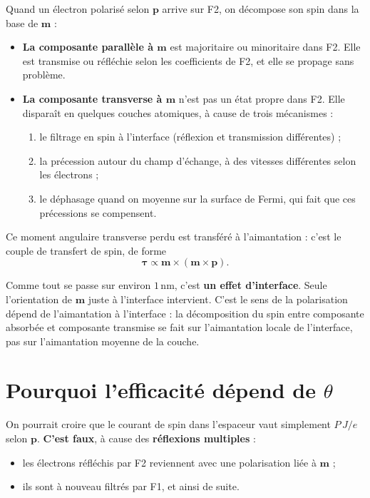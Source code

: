 \documentclass[11pt,a4paper]{article}
\newcommand{\vm}{\bm{m}}
\newcommand{\vp}{\bm{p}}
\begin{document}
Quand un électron polarisé selon $\vp$ arrive sur F2, on décompose son
spin dans la base de $\vm$ :
\begin{itemize}
  \item \textbf{La composante parallèle à $\vm$} est majoritaire ou
    minoritaire dans F2. Elle est transmise ou réfléchie selon les
    coefficients de F2, et elle se propage sans problème.
  \item \textbf{La composante transverse à $\vm$} n'est pas un état propre
    dans F2. Elle disparaît en quelques couches atomiques, à cause de trois
    mécanismes :
    \begin{enumerate}
      \item le filtrage en spin à l'interface (réflexion et transmission
        différentes) ;
      \item la précession autour du champ d'échange, à des vitesses
        différentes selon les électrons ;
      \item le déphasage quand on moyenne sur la surface de Fermi, qui fait
        que ces précessions se compensent.
    \end{enumerate}
\end{itemize}

Ce moment angulaire transverse perdu est transféré à l'aimantation :
c'est le couple de transfert de spin, de forme
\begin{equation}
  \bm{\tau} \propto \vm\times(\vm\times\vp).
\end{equation}

Comme tout se passe sur environ $1\,\mathrm{nm}$, c'est \textbf{un effet
d'interface}. Seule l'orientation de $\vm$ juste à l'interface intervient.
C'est le sens de \og la polarisation dépend de l'aimantation à
l'interface \fg{} : la décomposition du spin entre composante absorbée et
composante transmise se fait sur l'aimantation locale de l'interface, pas
sur l'aimantation moyenne de la couche.

\section{Pourquoi l'efficacité dépend de \texorpdfstring{$\theta$}{θ}}

On pourrait croire que le courant de spin dans l'espaceur vaut simplement
$P\,J/e$ selon $\vp$. \textbf{C'est faux}, à cause des \textbf{réflexions
multiples} :
\begin{itemize}
  \item les électrons réfléchis par F2 reviennent avec une polarisation
    liée à $\vm$ ;
  \item ils sont à nouveau filtrés par F1, et ainsi de suite.
\end{itemize}
\end{document}
